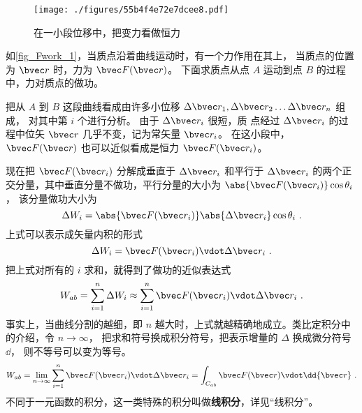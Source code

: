 

\begin{figure}[ht]
\centering
\texttt{[image: ./figures/55b4f4e72e7dcee8.pdf]}
\caption{在一小段位移中，把变力看做恒力}\label{fig_Fwork_1}
\end{figure}

如\autoref{fig_Fwork_1}，当质点沿着曲线运动时，有一个力作用在其上， 当质点的位置为 $\bvec r$ 时，力为 $\bvec F(\bvec r)$。 下面求质点从点 $A$ 运动到点 $B$ 的过程中，力对质点的做功。

把从 $A$ 到 $B$ 这段曲线看成由许多小位移 $\Delta \bvec r_1, \Delta \bvec r_2 \dots \Delta \bvec r_n$ 组成， 对其中第 $i$ 个进行分析。 由于 $\Delta \bvec r_i$ 很短，质
点经过 $\Delta \bvec r_i$ 的过程中位矢 $\bvec r$ 几乎不变，记为常矢量 $\bvec r_i$。 在这小段中，  $\bvec F(\bvec r)$ 也可以近似看成是恒力 $\bvec F(\bvec r_i)$。 

现在把 $\bvec F(\bvec r_i)$ 分解成垂直于 $\Delta \bvec r_i$ 和平行于 $\Delta \bvec r_i$ 的两个正交分量，其中垂直分量不做功，平行分量的大小为 $ \abs{\bvec F(\bvec r_i)} \cos \theta_i$， 该分量做功大小为
\begin{equation}
\Delta W_i = \abs{\bvec F(\bvec r_i)} \abs{\Delta \bvec r_i} \cos \theta_i~.
\end{equation}
上式可以表示成矢量内积的形式
\begin{equation}\label{eq_Fwork_2}
\Delta W_i = \bvec F(\bvec r_i) \vdot \Delta \bvec r_i~.
\end{equation}
把上式对所有的 $i$ 求和，就得到了做功的近似表达式
\begin{equation}
W_{ab} = \sum_{i = 1}^n \Delta W_i  \approx \sum_{i = 1}^n \bvec F(\bvec r_i) \vdot \Delta \bvec r_i ~.
\end{equation} 
事实上，当曲线分割的越细，即 $n$ 越大时，上式就越精确地成立。类比定积分中的介绍，令 $n \to \infty $， 把求和符号换成积分符号，把表示增量的 $\Delta $ 换成微分符号 $\dd{}$， 则不等号可以变为等号。
\begin{equation}\label{eq_Fwork_1}
W_{ab} = \lim_{n \to \infty } \sum_{i = 1}^n \bvec F(\bvec r_i) \vdot \Delta \bvec r_i  = \int_{C_{ab}} \bvec F(\bvec r) \vdot \dd{\bvec r}~.
\end{equation} 
不同于一元函数的积分，这一类特殊的积分叫做\textbf{线积分}，详见“线积分”。

